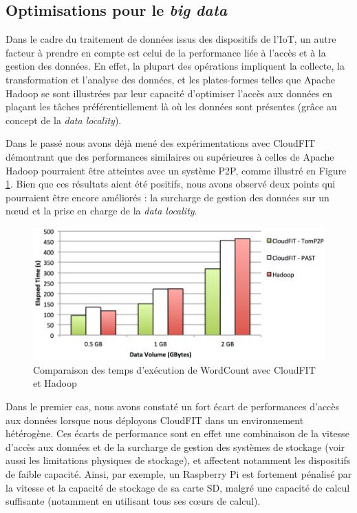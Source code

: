 \subsection{Optimisations pour le \textit{big data}}
%
Dans le cadre du traitement de données issus des dispositifs de l'IoT, un autre facteur à prendre en compte est celui de la performance liée à l'accès et à la gestion des données. En effet, la plupart des opérations impliquent la collecte, la transformation et l'analyse des données, et les plates-formes telles que Apache Hadoop se sont illustrées par leur capacité d'optimiser l'accès aux données en plaçant les tâches préférentiellement là où les données sont présentes (grâce au concept de la \textit{data locality}). 

Dans le passé \cite{Steffenel2015Roma} nous avons déjà mené des expérimentations avec CloudFIT démontrant que des performances similaires ou supérieures à celles de Apache Hadoop pourraient être atteintes avec un système P2P, comme illustré en Figure \ref{fig:Hadoop}. Bien que ces résultats aient été positifs, nous avons observé deux points qui pourraient être encore améliorés : la surcharge de gestion des données sur un n{\oe}ud et la prise en charge de la \textit{data locality}. 

\begin{figure}[!ht]
	\centering
	\includegraphics[width=0.65\linewidth]{img/CloudFIT-mesures.pdf}
	\caption{Comparaison des temps d'exécution de WordCount avec CloudFIT et Hadoop}
	\label{fig:Hadoop}
\end{figure}

Dans le premier cas, nous avons constaté un fort écart de performances d'accès aux données lorsque nous déployons CloudFIT  dans un environnement hétérogène. Ces écarts de performance sont en effet une combinaison de la vitesse d'accès aux données et de la surcharge de gestion des systèmes de stockage (voir aussi les limitations physiques de stockage), et affectent notamment les dispositifs de faible capacité. Ainsi, par exemple, un Raspberry Pi est fortement pénalisé par la vitesse et la capacité de stockage de sa carte SD, malgré une capacité de calcul suffisante (notamment en utilisant tous ses c{\oe}urs de calcul).  

